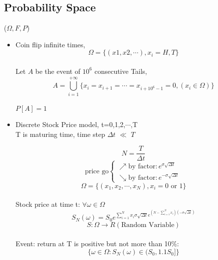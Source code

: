 \subsection{Probability Space}
($\Omega,F,P$)
\begin{example}{}
    \begin{itemize}
        \item Coin flip infinite times, \[\Omega=\{(x1,x2,\cdots),x_i=H , T\}\]
        \\ Let $A$ be the event of $10^6$ consecutive Tails, 
        \[ 
            A=\bigcup_{i=1}^{+\infty}\{x_i=x_{i+1}=\cdots=x_{i+10^6-1}=0,(x_i \in \Omega)\} 
             \]
        \\$P[A]=1$
        \item Discrete Stock Price model, t=0,1,2,$\cdots$,T
        \\T is maturing time, time step $\Delta t$ $\ll$ $T$
        
        \[ N=\frac{T}{\Delta t}
        \] \[ \text{price go} \begin{cases} \nearrow \text{by factor}: e^{\sigma \sqrt{\Delta t}}\\\searrow \text{by factor}:e^{-\sigma \sqrt{\Delta t}}
        \end{cases} \]
        \[\Omega=\{(x_1,x_2,\cdots,x_N),x_i=0 \text{ or }1\}\]
        \\Stock price at time t: $\forall \omega \in \Omega$
        \[ S_N(\omega)=S_0e^{\sum_{i=1}^{N}x_i{\sigma \sqrt{\Delta t}}{e^{(N-\sum_{i=1}^{N}x_i)(-\sigma \sqrt{\Delta t})}}}\]
        \[S: \Omega \rightarrow R (\text{Random Variable})\]
        \\Event: return at T is positive but not more than 10\%:
        \[\{\omega \in \Omega:S_N(\omega)\in(S_0,1.1S_0]\}\]
    \end{itemize}
\end{example}

